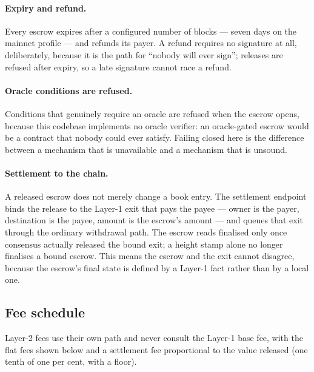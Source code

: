 \documentclass{article}
\begin{document}
\paragraph{Expiry and refund.} Every escrow expires after a configured number
of blocks --- seven days on the mainnet profile --- and refunds its payer. A
refund requires no signature at all, deliberately, because it is the path for
``nobody will ever sign''; releases are refused after expiry, so a late
signature cannot race a refund.

\paragraph{Oracle conditions are refused.} Conditions that genuinely require an
oracle are refused when the escrow opens, because this codebase implements no
oracle verifier: an oracle-gated escrow would be a contract that nobody could
ever satisfy. Failing closed here is the difference between a mechanism that
is unavailable and a mechanism that is unsound.

\paragraph{Settlement to the chain.} A released escrow does not merely change
a book entry. The settlement endpoint binds the release to the Layer-1 exit
that pays the payee --- owner is the payer, destination is the payee, amount is
the escrow's amount --- and queues that exit through the ordinary withdrawal
path. The escrow reads finalised only once consensus actually released the
bound exit; a height stamp alone no longer finalises a bound escrow. This
means the escrow and the exit cannot disagree, because the escrow's final
state is defined by a Layer-1 fact rather than by a local one.

\subsection{Fee schedule}

Layer-2 fees use their own path and never consult the Layer-1 base fee, with
the flat fees shown below and a settlement fee proportional to the value
released (one tenth of one per cent, with a floor).
\end{document}
